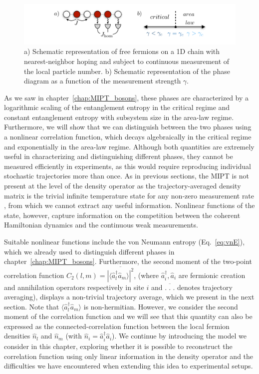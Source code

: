     \begin{figure}[ht]
        \centering
        \includegraphics[width = \textwidth]{Chapters/Plots/Chapter5/Chapter4_Fig1.pdf}
        \caption{a) Schematic representation of free fermions on a 1D chain with nearest-neighbor hoping and subject to continuous measurement of the local particle number. b) Schematic representation of the phase diagram as a function of the measurement strength $\gamma$.}
        \label{fig:Chapter4_Fig1}
    \end{figure}
    
As we saw in chapter~\ref{chap:MIPT_bosons}, these phases are characterized by a logarithmic scaling of the entanglement entropy in the critical regime and constant entanglement entropy with subsystem size in the area-law regime. Furthermore, we will show that we can distinguish between the two phases using a nonlinear correlation function, which decays algebraically in the critical regime and exponentially in the area-law regime. Although both quantities are extremely useful in characterizing and distinguishing different phases, they cannot be measured efficiently in experiments, as this would require reproducing individual stochastic trajectories more than once. As in previous sections, the MIPT is not present at the level of the density operator as the trajectory-averaged density matrix is the trivial infinite temperature state for any non-zero measurement rate \cite{li2018,li2019,bao2020,alberton2021}, from which we cannot extract any useful information. Nonlinear functions of the state, however, capture information on the competition between the coherent Hamiltonian dynamics and the continuous weak measurements. 

Suitable nonlinear functions include the von Neumann entropy (Eq.~\ref{eq:vnE}), which we already used to distinguish different phases in chapter~\ref{chap:MIPT_bosons}. Furthermore, the second moment of the two-point correlation function $C_2(l,m) = \overline{|\langle \hat{a}^\dagger_l \hat{a}_{m} \rangle|^2}$, (where $\hat{a}^\dagger_i,\hat{a}_i$ are fermionic creation and annihilation operators respectively in site $i$ and $\overline{.\phantom{l}.\phantom{l}.}$ denotes trajectory averaging), displays a non-trivial trajectory average, which we present in the next section. Note that $\langle \hat{a}^\dagger_l \hat{a}_{m} \rangle$ is non-hermitian. However, we consider the second moment of the correlation function and we will see that this quantity can also be expressed as the connected-correlation function between the local fermion densities $\hat{n}_l$ and $\hat{n}_{m}$ (with $\hat{n}_i = \hat{a}_i^\dagger \hat{a}_i$). We continue by introducing the model we consider in this chapter, exploring whether it is possible to reconstruct the correlation function using only linear information in the density operator and the difficulties we have encountered when extending this idea to experimental setups.

